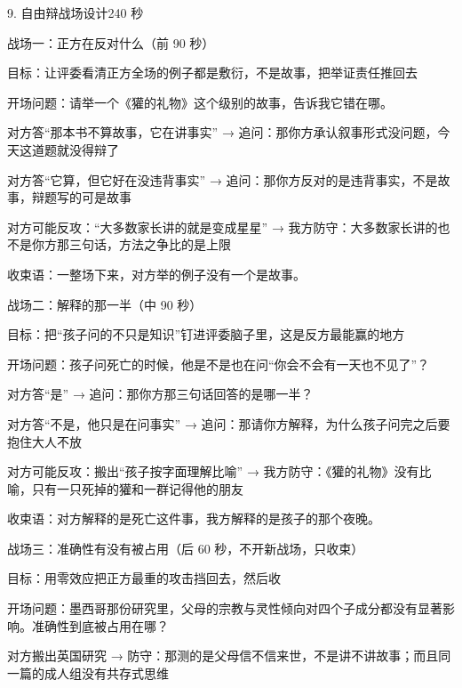 \documentclass[script,con]{debate}
\begin{document}
\begin{stage}{9. 自由辩战场设计}{240 秒}
\begin{battleground}{战场一：正方在反对什么（前 90 秒）}
\begin{bullets}
\item 目标：让评委看清正方全场的例子都是敷衍，不是故事，把举证责任推回去
\item 开场问题：请举一个《獾的礼物》这个级别的故事，告诉我它错在哪。
\item 对方答“那本书不算故事，它在讲事实” → 追问：那你方承认叙事形式没问题，今天这道题就没得辩了
\item 对方答“它算，但它好在没违背事实” → 追问：那你方反对的是违背事实，不是故事，辩题写的可是故事
\item 对方可能反攻：“大多数家长讲的就是变成星星” → 我方防守：大多数家长讲的也不是你方那三句话，方法之争比的是上限
\item 收束语：一整场下来，对方举的例子没有一个是故事。
\end{bullets}
\end{battleground}
\begin{battleground}{战场二：解释的那一半（中 90 秒）}
\begin{bullets}
\item 目标：把“孩子问的不只是知识”钉进评委脑子里，这是反方最能赢的地方
\item 开场问题：孩子问死亡的时候，他是不是也在问“你会不会有一天也不见了”？
\item 对方答“是” → 追问：那你方那三句话回答的是哪一半？
\item 对方答“不是，他只是在问事实” → 追问：那请你方解释，为什么孩子问完之后要抱住大人不放
\item 对方可能反攻：搬出“孩子按字面理解比喻” → 我方防守：《獾的礼物》没有比喻，只有一只死掉的獾和一群记得他的朋友
\item 收束语：对方解释的是死亡这件事，我方解释的是孩子的那个夜晚。
\end{bullets}
\end{battleground}
\begin{battleground}{战场三：准确性有没有被占用（后 60 秒，不开新战场，只收束）}
\begin{bullets}
\item 目标：用零效应把正方最重的攻击挡回去，然后收
\item 开场问题：墨西哥那份研究里，父母的宗教与灵性倾向对四个子成分都没有显著影响。准确性到底被占用在哪？
\item 对方搬出英国研究 → 防守：那测的是父母信不信来世，不是讲不讲故事；而且同一篇的成人组没有共存式思维

\end{bullets}
\end{battleground}
\end{stage}
\end{document}
